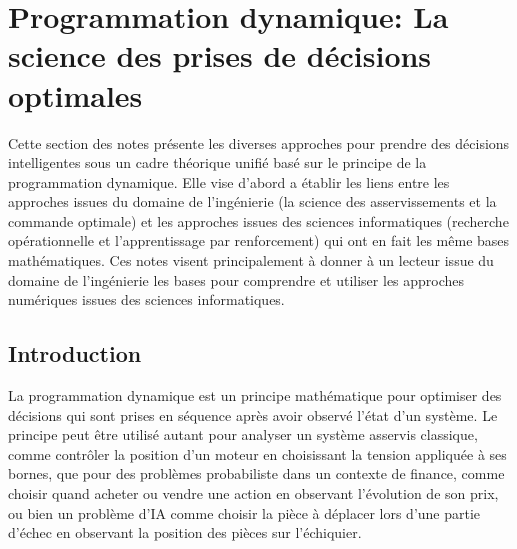 \chapter{Programmation dynamique: La science des prises de décisions optimales}
\label{sec:decision}





Cette section des notes présente les diverses approches pour prendre des décisions intelligentes sous un cadre théorique unifié basé sur le principe de la programmation dynamique. Elle vise d'abord a établir les liens entre les approches issues du domaine de l'ingénierie (la science des asservissements et la commande optimale) et les approches issues des sciences informatiques (recherche opérationnelle et l'apprentissage par renforcement) qui ont en fait les même bases mathématiques. Ces notes visent principalement à donner à un lecteur issue du domaine de l'ingénierie les bases pour comprendre et utiliser les approches numériques issues des sciences informatiques. 




\section{Introduction}
La programmation dynamique est un principe mathématique pour optimiser des décisions qui sont prises en séquence après avoir observé l'état d'un système. Le principe peut être utilisé autant pour analyser un système asservis classique, comme contrôler la position d'un moteur en choisissant la tension appliquée à ses bornes, que pour des problèmes probabiliste dans un contexte de finance, comme choisir quand acheter ou vendre une action en observant l'évolution de son prix, ou bien un problème d'IA comme choisir la pièce à déplacer lors d'une partie d'échec en observant la position des pièces sur l'échiquier.

